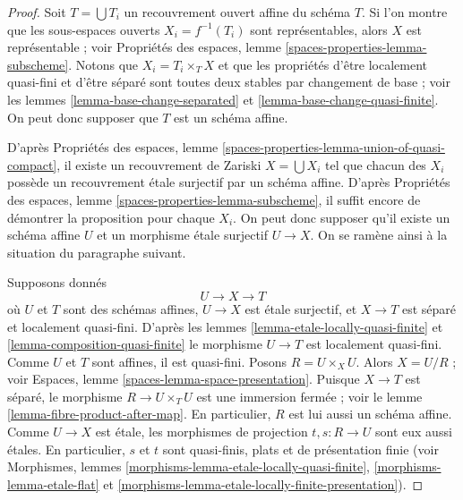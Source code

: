 \begin{proof}
Soit $T = \bigcup T_i$ un recouvrement ouvert affine du schéma $T$.
Si l'on montre que les sous-espaces ouverts $X_i = f^{-1}(T_i)$ sont
représentables, alors $X$ est représentable ; voir
Propriétés des espaces, lemme \ref{spaces-properties-lemma-subscheme}.
Notons que $X_i = T_i \times_T X$ et que les propriétés d'être localement quasi-fini
et d'être séparé sont toutes deux stables par changement de base ; voir les
lemmes \ref{lemma-base-change-separated} et
\ref{lemma-base-change-quasi-finite}.
On peut donc supposer que $T$ est un schéma affine.

\medskip\noindent
D'après
Propriétés des espaces,
lemme \ref{spaces-properties-lemma-union-of-quasi-compact},
il existe un recouvrement de Zariski $X = \bigcup X_i$
tel que chacun des $X_i$ possède un recouvrement étale surjectif par
un schéma affine. D'après
Propriétés des espaces, lemme \ref{spaces-properties-lemma-subscheme},
il suffit encore de démontrer la proposition pour chaque $X_i$.
On peut donc supposer qu'il existe un schéma affine $U$ et un
morphisme étale surjectif $U \to X$. On se ramène ainsi à la
situation du paragraphe suivant.

\medskip\noindent
Supposons donnés
$$
U \longrightarrow X \longrightarrow T
$$
où $U$ et $T$ sont des schémas affines, $U \to X$ est étale surjectif, et
$X \to T$ est séparé et localement quasi-fini. D'après les
lemmes \ref{lemma-etale-locally-quasi-finite} et
\ref{lemma-composition-quasi-finite}
le morphisme $U \to T$ est localement quasi-fini.
Comme $U$ et $T$ sont affines, il est quasi-fini.
Posons $R = U \times_X U$. Alors $X = U/R$ ; voir
Espaces, lemme \ref{spaces-lemma-space-presentation}.
Puisque $X \to T$ est séparé, le
morphisme $R \to U \times_T U$ est une immersion fermée ; voir le
lemme \ref{lemma-fibre-product-after-map}.
En particulier, $R$ est lui aussi un schéma affine.
Comme $U \to X$ est étale, les morphismes de projection
$t, s : R \to U$ sont eux aussi étales. En particulier, $s$ et $t$ sont
quasi-finis, plats et de présentation finie (voir
Morphismes, lemmes \ref{morphisms-lemma-etale-locally-quasi-finite},
\ref{morphisms-lemma-etale-flat} et
\ref{morphisms-lemma-etale-locally-finite-presentation}).


\end{proof}
